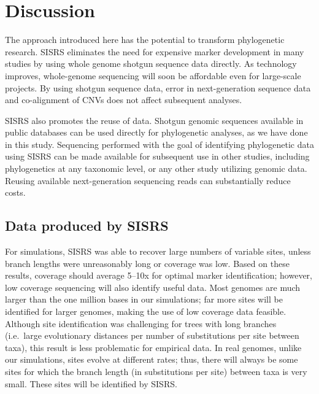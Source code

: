 \documentclass[11pt, oneside]{article}   	%
\begin{document}
\section{Discussion\label{sec:Discussion}}

The approach introduced here has the potential to transform phylogenetic research.
SISRS eliminates the need for expensive marker development in many studies by using whole genome shotgun sequence data directly.
As technology improves, whole-genome sequencing will soon be affordable even for large-scale projects. 
By using shotgun sequence data, error in next-generation sequence data and co-alignment of CNVs does not affect subsequent analyses.

SISRS also promotes the reuse of data.
Shotgun genomic sequences available in public databases can be used directly for phylogenetic analyses, as we have done in this study.
Sequencing performed with the goal of identifying phylogenetic data using SISRS can be made available for subsequent use in other studies, including phylogenetics at any taxonomic level, or any other study utilizing genomic data.
Reusing available next-generation sequencing reads can substantially reduce costs.

\subsection{Data produced by SISRS}

For simulations, SISRS was able to recover large numbers of variable sites, unless branch lengths were unreasonably long or coverage was low.
Based on these results, coverage should average 5--10x for optimal marker identification; however, low coverage sequencing will also identify useful data.
Most genomes are much larger than the one million bases in our simulations; far more sites will be identified for larger genomes, making the use of low coverage data feasible.
Although site identification was challenging for trees with long branches (i.e.\ large evolutionary distances per number of substitutions per site between taxa), this result is less problematic for empirical data.
In real genomes, unlike our simulations, sites evolve at different rates; thus, there will always be some sites for which the branch length (in substitutions per site) between taxa is very small.
These sites will be identified by SISRS.
\end{document}
